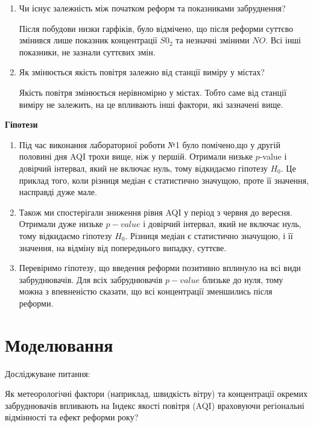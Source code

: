 \documentclass{article}
\begin{document}
\begin{enumerate}
    \item Чи існує залежність між початком реформ та показниками забруднення?
    
    Після побудови низки гарфіків, було відмічено, що після реформи суттєво змінився 
    лише показник концентрації $S0_2$ та незначні зміними $NO$. Всі інші показники, не зазнали суттєвих змін.
    
    \item Як змінюється якість повітря залежно від станції виміру у містах?
    
    Якість повітря змінюється нерівномірно у містах. Тобто саме від станції виміру не залежить, 
    на це впливають інші фактори, які зазначені вище.
\end{enumerate}

\textbf{Гіпотези}
\begin{enumerate}
    \item   Під час виконання лабораторної роботи №1 було помічено,що у другій половині дня AQI трохи вище, ніж у першій.
    Отримали низьке $p$-value і довірчий інтервал, який не включає нуль, 
    тому відкидаємо гіпотезу $H_0$. Це приклад того, коли різниця медіан є 
    статистично значущою, проте її значення, насправді дуже мале.

    \item Також ми спостерігали зниження рівня AQI у період з червня до вересня.
    Отримали дуже низьке $p-value$ і довірчий інтервал, 
    який не включає нуль, тому відкидаємо гіпотезу $H_0$. 
    Різниця медіан є статистично значущою, і її значення, 
    на відміну від попереднього випадку, суттєве.

    \item Перевіримо гіпотезу, що введення реформи позитивно вплинуло на всі види забруднювачів.
     Для всіх забруднювачів $p-value$ близьке до нуля, тому можна з впевненістю сказати, що всі концентрації зменшились після реформи.
  

\end{enumerate}

\newpage
\section{Моделювання}
Досліджуване питання: 

Як метеорологічні фактори (наприклад, швидкість вітру) та концентрації окремих 
забруднювачів впливають на Індекс якості повітря (AQI) 
враховуючи регіональні відмінності та ефект реформи року?
\end{document}
